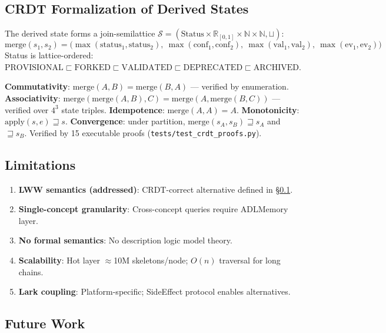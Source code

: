 \documentclass[11pt,a4paper]{article}
\theoremstyle{remark}
\begin{document}
\subsection{CRDT Formalization of Derived States}
\label{sec:crdt}

The derived state forms a join-semilattice $\mathcal{S} = (\text{Status} \times \mathbb{R}_{[0,1]} \times \mathbb{N} \times \mathbb{N}, \sqcup)$:
\[
\text{merge}(s_1, s_2) = \big(\max(\text{status}_1, \text{status}_2),\ \max(\text{conf}_1, \text{conf}_2),\ \max(\text{val}_1, \text{val}_2),\ \max(\text{ev}_1, \text{ev}_2)\big)
\]
Status is lattice-ordered: $\text{PROVISIONAL} \sqsubset \text{FORKED} \sqsubset \text{VALIDATED} \sqsubset \text{DEPRECATED} \sqsubset \text{ARCHIVED}$.

\textbf{Commutativity}: $\text{merge}(A,B) = \text{merge}(B,A)$ --- verified by enumeration. \textbf{Associativity}: $\text{merge}(\text{merge}(A,B),C) = \text{merge}(A,\text{merge}(B,C))$ --- verified over $4^3$ state triples. \textbf{Idempotence}: $\text{merge}(A,A) = A$. \textbf{Monotonicity}: $\text{apply}(s, e) \sqsupseteq s$. \textbf{Convergence}: under partition, $\text{merge}(s_A, s_B) \sqsupseteq s_A$ and $\sqsupseteq s_B$. Verified by 15 executable proofs (\texttt{tests/test\_crdt\_proofs.py}).

\subsection{Limitations}
\label{sec:limitations}

\begin{enumerate}[label=(\arabic*)]
    \item \textbf{LWW semantics (addressed)}: CRDT-correct alternative defined in \S\ref{sec:crdt}.
    \item \textbf{Single-concept granularity}: Cross-concept queries require ADLMemory layer.
    \item \textbf{No formal semantics}: No description logic model theory.
    \item \textbf{Scalability}: Hot layer $\approx$10M skeletons/node; $O(n)$ traversal for long chains.
    \item \textbf{Lark coupling}: Platform-specific; SideEffect protocol enables alternatives.
\end{enumerate}

\subsection{Future Work}
\end{document}
